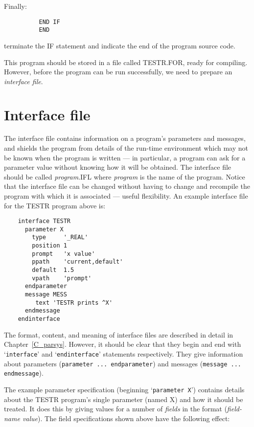 Finally:

\begin{small}
\begin{verbatim}
          END IF
          END
\end{verbatim}
\end{small}

terminate the IF statement and indicate the end of the program source code.

This program should be stored in a file called TESTR.FOR, ready for compiling.
However, before the program can be run successfully, we need to prepare an
{\em interface file}.

\section{Interface file}
\label{S_Inter}

The interface file contains information on a program's parameters and messages,
and shields the program from details of the run-time environment which may not be known
when the program is written --- in particular, a program can ask for a
parameter value without knowing how it will be obtained.
The interface file should be called {\em program}.IFL where {\em program} is
the name of the program.
Notice that the interface file can be changed without having to change and
recompile the program with which it is associated --- useful flexibility.
An example interface file for the TESTR program above is:

\begin{small}
\begin{verbatim}
    interface TESTR
      parameter X
        type     '_REAL'
        position 1
        prompt   'x value'
        ppath    'current,default'
        default  1.5
        vpath    'prompt'
      endparameter
      message MESS
         text 'TESTR prints ^X'
      endmessage
    endinterface
\end{verbatim}
\end{small}

The format, content, and meaning of interface files are described in detail in
Chapter~\ref{C_parsys}.
However, it should be clear that they begin and end with `\verb+interface+'
and `\verb+endinterface+' statements respectively.
They give information about parameters (\verb+parameter ... endparameter+) and
messages (\verb+message ... endmessage+).

The example parameter specification (beginning `\verb+parameter X+') contains
details about the TESTR program's single parameter (named X) and how it should
be treated.
It does this by giving values for a number of {\em fields} in the format
({\em field-name value}).
The field specifications shown above have the following effect:

